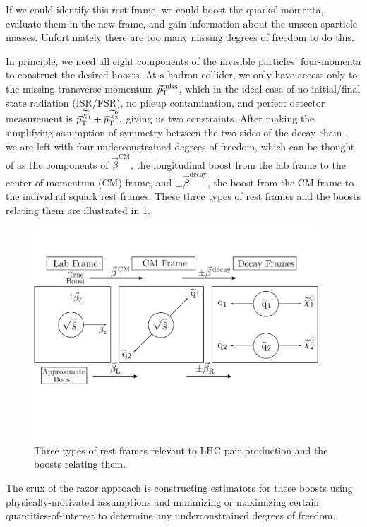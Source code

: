 If we could identify this rest frame, we could boost the quarks'
momenta, evaluate them in the new frame, and
gain information about the unseen sparticle masses. Unfortunately there are too many missing
degrees of freedom to do this. 

In principle, we need all eight components of the invisible particles'
four-momenta to construct the desired boosts. At a hadron collider, we only have access
only to the missing transverse momentum ${\vec p}_{\mathrm{T}}^{\kern1pt\text{miss}}$, which in the
ideal case of no initial/final state radiation (ISR/FSR), no pileup
contamination, and perfect detector measurement is ${\vec p}_{\mathrm{T}}^{\,\widetilde{\chi}^{0}_{1}}
+ {\vec p}_{\mathrm{T}}^{\,\widetilde{\chi}^{0}_{2}},$ giving us two constraints. After making the simplifying
assumption of symmetry between the two sides of the decay chain 
, we are left with four underconstrained degrees of freedom, which can be thought
of as the components of $\vec\beta^{\mathrm{CM}}$, the longitudinal boost from the
lab frame to the center-of-momentum (CM) frame, and
$\pm\vec\beta^{\mathrm{decay}}$, the boost from the CM frame to the
individual squark rest frames. These three types of rest frames and the
boosts relating them are illustrated in \ref{fig:frames}.

\begin{figure}[thb!]
\centering
\includegraphics[width=0.95\textwidth]{figs/theory/frames3.pdf}
\caption{Three types of rest frames relevant to LHC pair production
  and the boosts relating them.\label{fig:frames}}
\end{figure}

The crux of the razor approach is constructing estimators for these
boosts using physically-motivated assumptions and minimizing or
maximizing certain quantities-of-interest to determine any
underconstrained degrees of freedom. 

